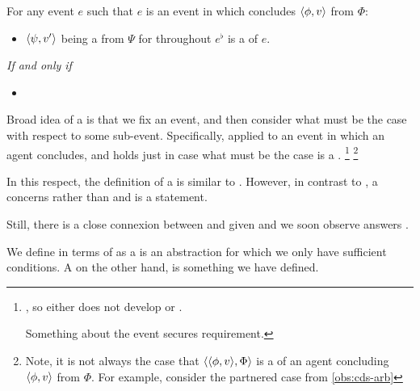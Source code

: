 \begin{note}
  \begin{definition}[A \requ{0}]%
    \label{def:requ}%
    For any event \(e\) such that \(e\) is an event in which \vAgent{} concludes \(\langle \phi, v \rangle\) from \(\Phi\):
    \begin{itemize}
    \item
      \(\langle \psi, v' \rangle\) being a \fc{} from \(\Psi\) for \vAgent{} throughout \(e^{\flat}\) is a \emph{\requ{}} of \(e\).
    \end{itemize}

    \emph{If and only if}

    \begin{itemize}
    \item
    \end{itemize}
    \vspace{-\baselineskip}
  \end{definition}

  \noindent%
  Broad idea of a \requ{} is that we fix an event, and then consider what must be the case with respect to some sub-event.
  Specifically, applied to an event in which an agent concludes, and holds just in case what must be the case is a \fc{}.%
  \footnote{
    , so either does not develop or \fc{}.

    Something about the event secures requirement.
  }%
  \footnote{
    Note, it is not always the case that \(\langle \langle \phi, v \rangle, \Phi \rangle\) is a \requ{} of an agent concluding \(\langle \phi, v \rangle\) from \(\Phi\).
    For example, consider the partnered case from \autoref{obs:cds-arb}
  }

  In this respect, the definition of a \requ{} is similar to \qWhy{}.
  However, in contrast to \qWhy{}, a \requ{} concerns  rather than  and is a statement.

  Still, there is a close connexion between  and \ros{} given \supportII{} and we soon observe \ros{} answers \qWhy{}.

  We define \requ{} in terms of  as a \ros{} is an abstraction for which we only have sufficient conditions.
  A \fc{} on the other hand, is something we have defined.
\end{note}

